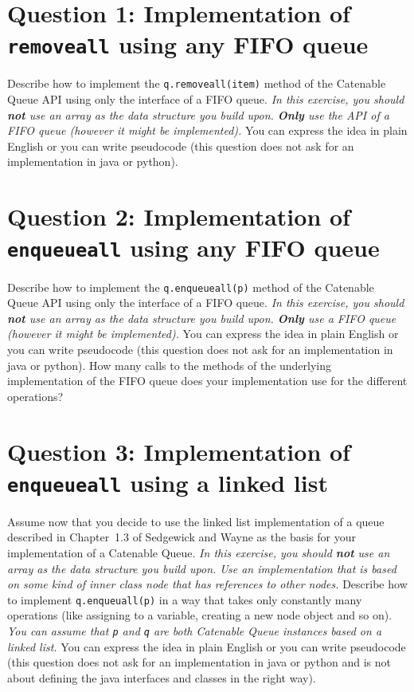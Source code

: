 \documentclass{tufte-handout}
\begin{document}
\section{\textbf{Question 1}: Implementation of \texttt{removeall} using any FIFO queue}

Describe how to implement the \texttt{q.removeall(item)} method of the Catenable Queue API using only the interface of a FIFO queue.
\emph{In this exercise, you should \textbf{not} use an array as the data structure you build upon. \textbf{Only} use the API of a FIFO queue (however it might be implemented).}
You can express the idea in plain English or you can write pseudocode (this question does not ask for an implementation in java or python).

\section{\textbf{Question 2}: Implementation of \texttt{enqueueall} using any FIFO queue}

Describe how to implement the \texttt{q.enqueueall(p)} method of the Catenable Queue API using only the interface of a FIFO queue.
\emph{In this exercise, you should \textbf{not} use an array as the data structure you build upon. \textbf{Only} use a FIFO queue (however it might be implemented).}
You can express the idea in plain English or you can write pseudocode (this question does not ask for an implementation in java or python).
How many calls to the methods of the underlying implementation of the  FIFO queue does your implementation use for the different operations?

\section{\textbf{Question 3}: Implementation of \texttt{enqueueall} using a linked list}

Assume now that you decide to use the linked list implementation of a queue described in Chapter~1.3 of Sedgewick and Wayne as the basis for your implementation of a Catenable Queue.
\emph{In this exercise, you should \textbf{not} use an array as the data structure you build upon.
  Use an implementation that is based on some kind of inner class node that has references to other nodes.}
Describe how to implement \texttt{q.enqueuall(p)} in a way that takes only constantly many operations (like assigning to a variable, creating a new node object and so on).
\emph{You can assume that \texttt{p} and \texttt{q} are both Catenable Queue instances based on a linked list.}
You can express the idea in plain English or you can write pseudocode (this question does not ask for an implementation in java or python and is not about defining the java interfaces and classes in the right way).
\end{document}

